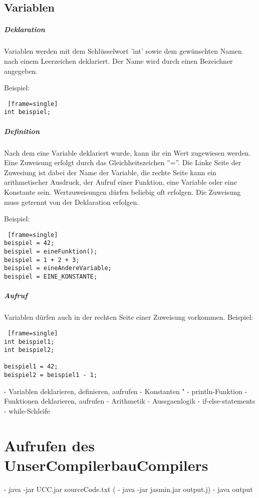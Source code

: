 \subsection*{Variablen}
\subparagraph{Deklaration}
Variablen werden mit dem Schlüsselwort 'int' sowie dem gewünschten Namen nach einem Leerzeichen deklariert.
Der Name wird durch einen Bezeichner angegeben.

Beispiel:
\begin{lstlisting} [frame=single] 
int beispiel;
\end{lstlisting}



\subparagraph{Definition}
Nach dem eine Variable deklariert wurde, kann ihr ein Wert zugewiesen werden. Eine Zuweisung erfolgt durch das Gleichheitszeichen ''=''. Die Linke Seite der Zuwesiung ist dabei der Name der Variable, die rechte Seite  kann ein arithmetischer Ausdruck, der Aufruf einer Funktion, eine Variable oder eine Konstante sein.
Wertzuweisungen dürfen beliebig oft erfolgen.
Die Zuweisung muss getrennt von der Deklaration erfolgen.

Beispiel:
\begin{lstlisting} [frame=single] 
beispiel = 42;
beispiel = eineFunktion();
beispiel = 1 + 2 + 3;
beispiel = eineAndereVariable;
beispiel = EINE_KONSTANTE;
\end{lstlisting}

\subparagraph{Aufruf}
Variablen dürfen auch in der rechten Seite einer Zuweisung vorkommen.
Beispiel:
\begin{lstlisting} [frame=single] 
int beispiel1;
int beispiel2;

beispiel1 = 42;
beispiel2 = beispiel1 - 1;
\end{lstlisting}


	- Variablen deklarieren, definieren, aufrufen
	- Konstanten "	
	- println-Funktion
	- Funktionen deklarieren, aufrufen
	- Arithmetik
	- Aussgaenlogik
	- if-else-statements
	- while-Schleife
	
\section{Aufrufen des UnserCompilerbauCompilers}
	- java -jar UCC.jar sourceCode.txt
  (	- java -jar jasmin.jar output.j)
  	- java output
